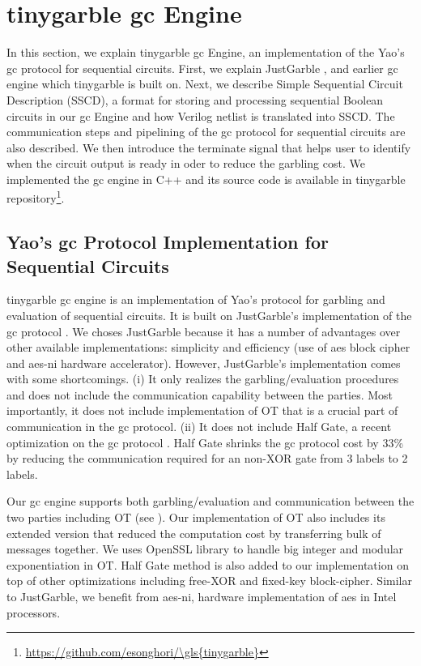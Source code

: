 \chapter{\gls{tinygarble} \acrshort{gc} Engine}\label{chap:engine}
In this section, we explain \gls{tinygarble} \acrshort{gc} Engine, an implementation of the Yao's \acrshort{gc} protocol for sequential circuits.
First, we explain JustGarble \cite{bellare2013efficient}, and earlier \acrshort{gc} engine which \gls{tinygarble} is built on. 
Next, we describe Simple Sequential Circuit Description (SSCD), a format for storing and processing sequential Boolean circuits in our \acrshort{gc} Engine and how Verilog netlist is translated into SSCD.
The communication steps and pipelining of the \acrshort{gc} protocol for sequential circuits are also described.
We then introduce the terminate signal that helps user to identify when the circuit output is ready in oder to reduce the garbling cost.
We implemented the \acrshort{gc} engine in C++ and its source code is available in \gls{tinygarble} repository\footnote{\url{https://github.com/esonghori/\gls{tinygarble}}}.

\section{Yao's \acrshort{gc} Protocol Implementation for Sequential Circuits} \label{sec:engine-gc}
\gls{tinygarble} \acrshort{gc} engine is an implementation of Yao's protocol for garbling and evaluation of sequential circuits.
It is built on JustGarble's implementation of the \acrshort{gc} protocol \cite{bellare2013efficient}.
We choses JustGarble because it has a number of advantages over other available implementations: simplicity and efficiency (use of \acrshort{aes} block cipher and \acrshort{aes-ni} hardware accelerator).
However, JustGarble's implementation comes with some shortcomings.
(i) It only realizes the garbling/evaluation procedures and does not include the communication capability between the parties.
Most importantly, it does not include implementation of OT that is a crucial part of communication in the \acrshort{gc} protocol.
(ii) It does not include Half Gate, a recent optimization on the \acrshort{gc} protocol \cite{zahur2015two}.
Half Gate shrinks the \acrshort{gc} protocol cost by 33\% by reducing the communication required for an non-XOR gate from 3 labels to 2 labels.

Our \acrshort{gc} engine supports both garbling/evaluation and communication between the two parties including OT (see ).
Our implementation of OT also includes its extended version \cite{husted2013gpu} that reduced the computation cost by transferring bulk of messages together.
We uses OpenSSL library to handle big integer and modular exponentiation in OT.
Half Gate method is also added to our implementation on top of other optimizations including free-XOR and fixed-key block-cipher.
Similar to JustGarble, we benefit from \acrshort{aes-ni}, hardware implementation of \acrshort{aes} in Intel processors.

